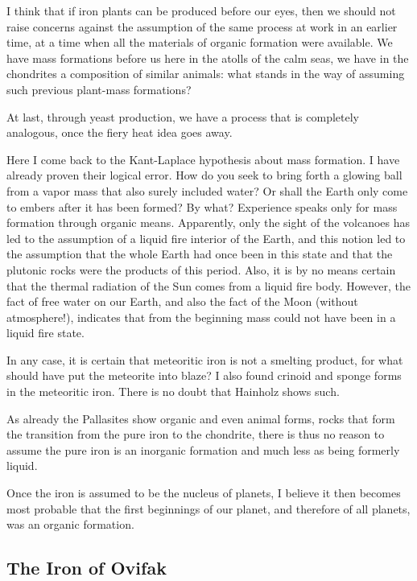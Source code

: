 \documentclass[a4paper, 12pt, oneside]{article}
\begin{document}
I think that if iron plants can be produced before our eyes, then we should not raise concerns against the assumption of the same process at work in an earlier time, at a time when all the materials of organic formation were available. We have mass formations before us here in the atolls of the calm seas, we have in the chondrites a composition of similar animals: what stands in the way of assuming such previous plant-mass formations?

At last, through yeast production, we have a process that is completely analogous, once the fiery heat idea goes away.

Here I come back to the Kant-Laplace hypothesis about mass formation. I have already proven their logical error. How do you seek to bring forth a glowing ball from a vapor mass that also surely included water? Or shall the Earth only come to embers after it has been formed? By what? Experience speaks only for mass formation through organic means. Apparently, only the sight of the volcanoes has led to the assumption of a liquid fire interior of the Earth, and this notion led to the assumption that the whole Earth had once been in this state and that the plutonic rocks were the products of this period. Also, it is by no means certain that the thermal radiation of the Sun comes from a liquid fire body. However, the fact of free water on our Earth, and also the fact of the Moon (without atmosphere!), indicates that from the beginning mass could not have been in a liquid fire state.

In any case, it is certain that meteoritic iron is not a smelting product, for what should have put the meteorite into blaze? I also found crinoid and sponge forms in the meteoritic iron. There is no doubt that Hainholz shows such.

As already the Pallasites show organic and even animal forms, rocks that form the transition from the pure iron to the chondrite, there is thus no reason to assume the pure iron is an inorganic formation and much less as being formerly liquid.

Once the iron is assumed to be the nucleus of planets, I believe it then becomes most probable that the first beginnings of our planet, and therefore of all planets, was an organic formation.
\clearpage
\subsection{The Iron of Ovifak}
\end{document}

